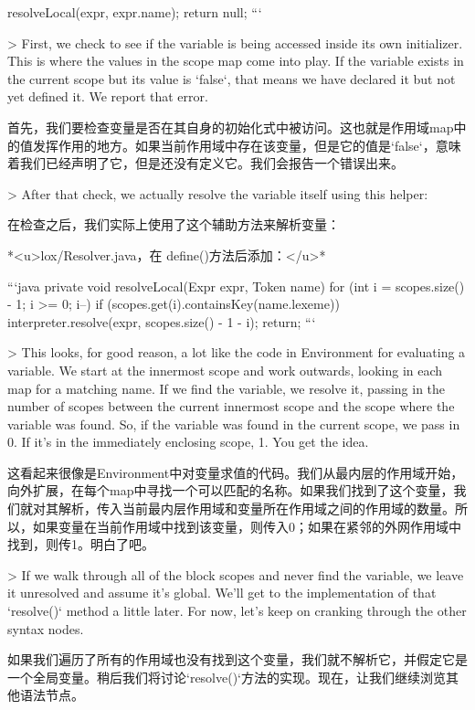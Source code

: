 \documentclass[cn,11pt,chinese]{elegantbook}
\begin{document}
{{{{{{{{{{{{{{    resolveLocal(expr, expr.name);
    return null;
  }
```

> First, we check to see if the variable is being accessed inside its own initializer. This is where the values in the scope map come into play. If the variable exists in the current scope but its value is `false`, that means we have declared it but not yet defined it. We report that error.

首先，我们要检查变量是否在其自身的初始化式中被访问。这也就是作用域map中的值发挥作用的地方。如果当前作用域中存在该变量，但是它的值是`false`，意味着我们已经声明了它，但是还没有定义它。我们会报告一个错误出来。

> After that check, we actually resolve the variable itself using this helper:

在检查之后，我们实际上使用了这个辅助方法来解析变量：

*<u>lox/Resolver.java，在 define()方法后添加：</u>*

```java
  private void resolveLocal(Expr expr, Token name) {
    for (int i = scopes.size() - 1; i >= 0; i--) {
      if (scopes.get(i).containsKey(name.lexeme)) {
        interpreter.resolve(expr, scopes.size() - 1 - i);
        return;
      }
    }
  }
```

> This looks, for good reason, a lot like the code in Environment for evaluating a variable. We start at the innermost scope and work outwards, looking in each map for a matching name. If we find the variable, we resolve it, passing in the number of scopes between the current innermost scope and the scope where the variable was found. So, if the variable was found in the current scope, we pass in 0. If it’s in the immediately enclosing scope, 1. You get the idea.

这看起来很像是Environment中对变量求值的代码。我们从最内层的作用域开始，向外扩展，在每个map中寻找一个可以匹配的名称。如果我们找到了这个变量，我们就对其解析，传入当前最内层作用域和变量所在作用域之间的作用域的数量。所以，如果变量在当前作用域中找到该变量，则传入0；如果在紧邻的外网作用域中找到，则传1。明白了吧。

> If we walk through all of the block scopes and never find the variable, we leave it unresolved and assume it’s global. We’ll get to the implementation of that `resolve()` method a little later. For now, let’s keep on cranking through the other syntax nodes.

如果我们遍历了所有的作用域也没有找到这个变量，我们就不解析它，并假定它是一个全局变量。稍后我们将讨论`resolve()`方法的实现。现在，让我们继续浏览其他语法节点。

}}}}}}}}}}}}}
\end{document}
